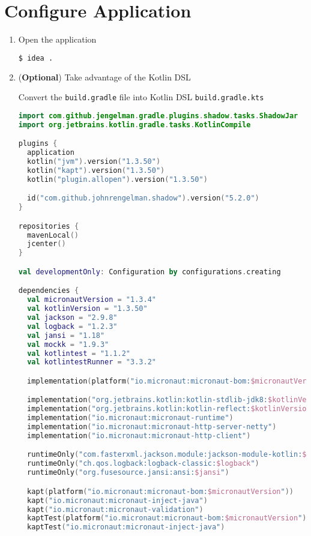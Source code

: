 \section{Configure Application}\label{sec:configuration}

\begin{enumerate}

\item Open the application

\begin{lstlisting}[language=bash]
$ idea .
\end{lstlisting}

\item (\textbf{Optional}) Take advantage of the Kotlin DSL

Convert the \texttt{build.gradle} file into Kotlin DSL \texttt{build.gradle.kts}
\begin{lstlisting}[language=Kotlin]
import com.github.jengelman.gradle.plugins.shadow.tasks.ShadowJar
import org.jetbrains.kotlin.gradle.tasks.KotlinCompile

plugins {
  application
  kotlin("jvm").version("1.3.50")
  kotlin("kapt").version("1.3.50")
  kotlin("plugin.allopen").version("1.3.50")

  id("com.github.johnrengelman.shadow").version("5.2.0")
}

repositories {
  mavenLocal()
  jcenter()
}

val developmentOnly: Configuration by configurations.creating

dependencies {
  val micronautVersion = "1.3.4"
  val kotlinVersion = "1.3.50"
  val jackson = "2.9.8"
  val logback = "1.2.3"
  val jansi = "1.18"
  val mockk = "1.9.3"
  val kotlintest = "1.1.2"
  val kotlintestRunner = "3.3.2"

  implementation(platform("io.micronaut:micronaut-bom:$micronautVersion"))

  implementation("org.jetbrains.kotlin:kotlin-stdlib-jdk8:$kotlinVersion")
  implementation("org.jetbrains.kotlin:kotlin-reflect:$kotlinVersion")
  implementation("io.micronaut:micronaut-runtime")
  implementation("io.micronaut:micronaut-http-server-netty")
  implementation("io.micronaut:micronaut-http-client")

  runtimeOnly("com.fasterxml.jackson.module:jackson-module-kotlin:$jackson")
  runtimeOnly("ch.qos.logback:logback-classic:$logback")
  runtimeOnly("org.fusesource.jansi:ansi:$jansi")

  kapt(platform("io.micronaut:micronaut-bom:$micronautVersion"))
  kapt("io.micronaut:micronaut-inject-java")
  kapt("io.micronaut:micronaut-validation")
  kaptTest(platform("io.micronaut:micronaut-bom:$micronautVersion"))
  kaptTest("io.micronaut:micronaut-inject-java")


\end{lstlisting}
\end{enumerate}
